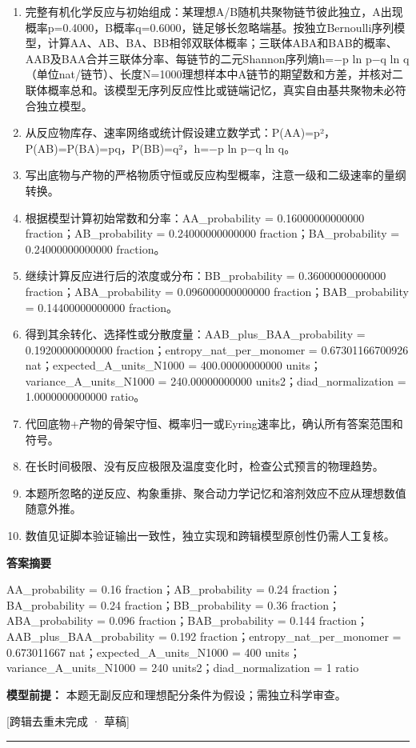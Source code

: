 \documentclass[UTF8,11pt,a4paper]{ctexart}
\begin{document}
\begin{enumerate}
\item 完整有机化学反应与初始组成：某理想A/B随机共聚物链节彼此独立，A出现概率p=0.4000，B概率q=0.6000，链足够长忽略端基。按独立Bernoulli序列模型，计算AA、AB、BA、BB相邻双联体概率；三联体ABA和BAB的概率、AAB及BAA合并三联体分率、每链节的二元Shannon序列熵h=−p ln p−q ln q（单位nat/链节）、长度N=1000理想样本中A链节的期望数和方差，并核对二联体概率总和。该模型无序列反应性比或链端记忆，真实自由基共聚物未必符合独立模型。
\item 从反应物库存、速率网络或统计假设建立数学式：P(AA)=p²，P(AB)=P(BA)=pq，P(BB)=q²，h=−p ln p−q ln q。
\item 写出底物与产物的严格物质守恒或反应构型概率，注意一级和二级速率的量纲转换。
\item 根据模型计算初始常数和分率：AA\_probability = 0.16000000000000 fraction；AB\_probability = 0.24000000000000 fraction；BA\_probability = 0.24000000000000 fraction。
\item 继续计算反应进行后的浓度或分布：BB\_probability = 0.36000000000000 fraction；ABA\_probability = 0.096000000000000 fraction；BAB\_probability = 0.14400000000000 fraction。
\item 得到其余转化、选择性或分散度量：AAB\_plus\_BAA\_probability = 0.19200000000000 fraction；entropy\_nat\_per\_monomer = 0.67301166700926 nat；expected\_A\_units\_N1000 = 400.00000000000 units；variance\_A\_units\_N1000 = 240.00000000000 units2；diad\_normalization = 1.0000000000000 ratio。
\item 代回底物+产物的骨架守恒、概率归一或Eyring速率比，确认所有答案范围和符号。
\item 在长时间极限、没有反应极限及温度变化时，检查公式预言的物理趋势。
\item 本题所忽略的逆反应、构象重排、聚合动力学记忆和溶剂效应不应从理想数值随意外推。
\item 数值见证脚本验证输出一致性，独立实现和跨辑模型原创性仍需人工复核。
\end{enumerate}
\noindent\textbf{答案摘要}\par
AA\_probability = 0.16 fraction；AB\_probability = 0.24 fraction；BA\_probability = 0.24 fraction；BB\_probability = 0.36 fraction；ABA\_probability = 0.096 fraction；BAB\_probability = 0.144 fraction；AAB\_plus\_BAA\_probability = 0.192 fraction；entropy\_nat\_per\_monomer = 0.673011667 nat；expected\_A\_units\_N1000 = 400 units；variance\_A\_units\_N1000 = 240 units2；diad\_normalization = 1 ratio\par
\noindent\textbf{模型前提：}
本题无副反应和理想配分条件为假设；需独立科学审查。\par
\noindent\textcolor{red!65!black}{[跨辑去重未完成 · 草稿]} \par
\medskip\hrule\medskip
{}
\end{document}
